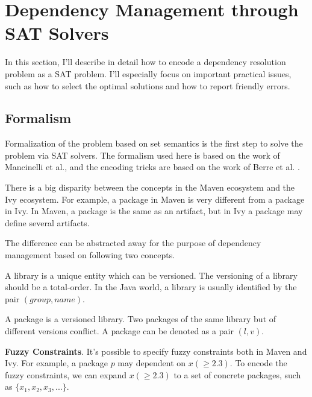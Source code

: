 \section{Dependency Management through SAT Solvers}

In this section, I'll describe in detail how to encode a dependency resolution problem as a SAT problem. I'll especially focus on important practical issues, such as how to select the optimal solutions and how to report friendly errors.

\subsection{Formalism}

Formalization of the problem based on set semantics is the first step to solve the problem via SAT solvers. The formalism used here is based on the work of Mancinelli et al.\cite{mancinelli2006managing}, and the encoding tricks are based on the work of Berre et al. \cite{berre2009dependency}.

There is a big disparity between the concepts in the Maven ecosystem and the Ivy ecosystem. For example, a package in Maven is very different from a package in Ivy. In Maven, a package is the same as an artifact, but in Ivy a package may define several artifacts.

The difference can be abstracted away for the purpose of dependency management based on following two concepts.

\begin{definition}[Library]
  A library is a unique entity which can be versioned.  The versioning of a library should be a total-order. In the Java world, a library is usually identified by the pair $(group, name)$.
\end{definition}

\begin{definition}[Package]
  A package is a versioned library. Two packages of the same library but of different versions conflict.  A package can be denoted as a pair $(l, v)$.
\end{definition}


\noindent
\textbf{Fuzzy Constraints}. It's possible to specify fuzzy constraints both in Maven and Ivy. For example, a package $p$ may dependent on $x(\geq 2.3)$. To encode the fuzzy constraints, we can expand $x(\geq 2.3)$ to a set of  concrete packages, such as $\{x_1, x_2, x_3, ...\}$.

